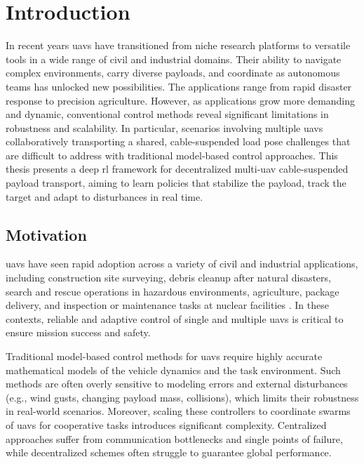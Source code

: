 \chapter{Introduction}
In recent years \glspl{uav} have transitioned from niche research platforms to versatile tools in a wide range of civil and industrial domains. Their ability to navigate complex environments, carry diverse payloads, and coordinate as autonomous teams has unlocked new possibilities. The applications range from rapid disaster response to precision agriculture. However, as applications grow more demanding and dynamic, conventional control methods reveal significant limitations in robustness and scalability. In particular, scenarios involving multiple \glspl{uav} collaboratively transporting a shared, cable-suspended load pose challenges that are difficult to address with traditional model-based control approaches.
This thesis presents a deep \gls{rl} framework for decentralized multi-\gls{uav} cable-suspended payload transport, aiming to learn policies that stabilize the payload, track the target and adapt to disturbances in real time.
\section{Motivation}
\glspl{uav} have seen rapid adoption across a variety of civil and industrial applications, including construction site surveying, debris cleanup after natural disasters, search and rescue operations in hazardous environments, agriculture, package delivery, and inspection or maintenance tasks at nuclear facilities \autocite{Idrissi2022AROA,Lyu2023UnmannedAVA,Chen2021FromUSA,Abbaraju2018SensingASA}. In these contexts, reliable and adaptive control of single and multiple \glspl{uav} is critical to ensure mission success and safety.

Traditional model-based control methods for \glspl{uav} require highly accurate mathematical models of the vehicle dynamics and the task environment. Such methods are often overly sensitive to modeling errors and external disturbances (e.g., wind gusts, changing payload mass, collisions), which limits their robustness in real-world scenarios. Moreover, scaling these controllers to coordinate swarms of \glspl{uav} for cooperative tasks introduces significant complexity. Centralized approaches suffer from communication bottlenecks and single points of failure, while decentralized schemes often struggle to guarantee global performance.

